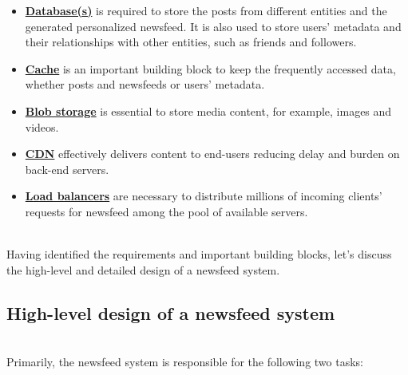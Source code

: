 \begin{itemize}
\item
\protect{}\label{tACpOS_sOzIy0HUFkqY9R}
\href{https://www.educative.io/courses/grokking-the-system-design-interview/introduction-to-databases}{\textbf{Database(s)}} is required to store the posts from different entities and the generated personalized newsfeed. It is also used to store users' metadata and their relationships with other entities, such as friends and followers.
\item
\protect{}\label{IsKAuDR8aMdMK_yEFMElO}
\href{https://www.educative.io/courses/grokking-the-system-design-interview/system-design-the-distributed-cache}{\textbf{Cache}} is an important building block to keep the frequently accessed data, whether posts and newsfeeds or users' metadata.
\item
\protect{}\label{s9bJvdFVkBytOc7moJK6_}
\href{https://www.educative.io/courses/grokking-the-system-design-interview/system-design-a-blob-store}{\textbf{Blob storage}} is essential to store media content, for example, images and videos.
\item
\protect{}\label{LMq5t8kF8-Ta78i37w3gh}
\href{https://www.educative.io/courses/grokking-the-system-design-interview/system-design-the-content-delivery-network-cdn}{\textbf{CDN}} effectively delivers content to end-users reducing delay and burden on back-end servers.
\item
\protect{}\label{_Y0ThHiJYlqUjcAeDyK7r}
\href{https://www.educative.io/courses/grokking-the-system-design-interview/introduction-to-load-balancers}{\textbf{Load balancers}} are necessary to distribute millions of incoming clients' requests for newsfeed among the pool of available servers.
\end{itemize}
\\
Having identified the requirements and important building blocks, let's discuss the high-level and detailed design of a newsfeed system.

\subsection{High-level design of a newsfeed system}\label{XeLx1fUSifJdnPrmeF7nS}
\\
Primarily, the newsfeed system is responsible for the following two tasks:

